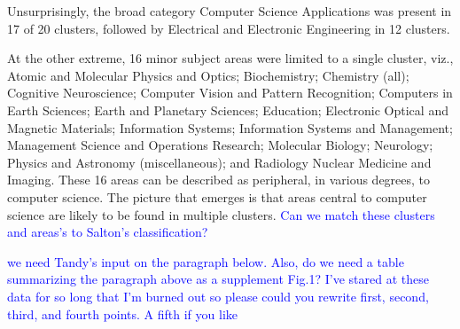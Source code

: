Unsurprisingly, the broad category Computer Science Applications was present in 17 of 20 clusters, followed by  Electrical and Electronic Engineering in 12 clusters. 

At the other extreme, 16 minor subject areas were limited to a single cluster, viz.,
Atomic and Molecular Physics and Optics; 
Biochemistry; 
Chemistry (all); 
Cognitive Neuroscience; 
Computer Vision and Pattern Recognition;
Computers in Earth Sciences;
Earth and Planetary Sciences; 
Education; 
Electronic Optical and Magnetic Materials; 
Information Systems; 
Information Systems and Management;  
Management Science and Operations Research;
Molecular Biology;
Neurology; 
Physics and Astronomy (miscellaneous); 
and Radiology Nuclear Medicine and Imaging. These 16 areas can be described as peripheral, in various degrees, to computer science. The picture that emerges is that areas central to computer science are likely to be found in multiple clusters. \textcolor{blue} {Can we match these clusters and areas's to Salton's classification?}

\textcolor{blue}{we need Tandy's input on the paragraph below. Also, do we need a table summarizing the paragraph above as a supplement Fig.1? I've stared at these data for so long that I'm burned out so please could you rewrite first, second, third, and fourth points. A fifth if you like}


